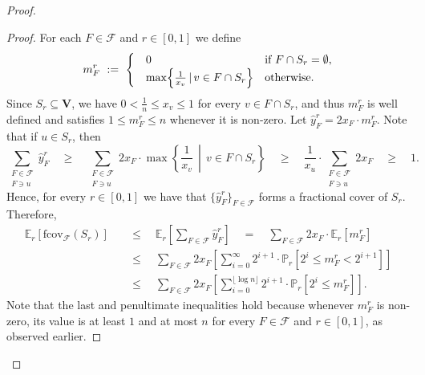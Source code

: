 \documentclass[11pt]{amsart}
\begin{document}
\begin{proof}
    \begin{proof}
        For each $F\in \mathcal{F}$ and $r\in [0,1]$ we define 
        $$
        m^r_F \ := \
        \begin{cases}
            \quad 0 & \text{if } F \cap S_r = \emptyset,\\
            \quad \max\Bigl\{ \frac{1}{x_v} \, |\, v \in F \cap S_r \Bigr\} & \text{otherwise}.
        \end{cases}
        $$    
        Since $S_r \subseteq \mathbf{V}$, we have $0 < \frac{1}{n} \leq x_v \leq 1$ for every $v \in F \cap S_r$, and thus $m^r_F$ is well defined and satisfies $1 \leq m^r_F \leq n$ whenever it is non-zero.
        Let $\hat{y}_F^r = 2x_F \cdot m^r_F$. Note that if $u \in S_r$, then
        $$
        \sum_{\substack{F \in \mathcal{F}\\ F \ni u}} \hat{y}_F^r \quad  
        \geq \quad \sum_{\substack{F \in \mathcal{F}\\ F \ni u}} 2x_F \cdot \max\left\{ \frac{1}{x_v} \,\middle|\, v \in F \cap S_r \right\} \quad 
        \geq \quad \frac{1}{x_u} \cdot \sum_{\substack{F \in \mathcal{F}\\ F \ni u}} 2x_F \quad 
        \geq \quad 1.
        $$
        Hence, for every $r \in [0, 1]$ we have that $\{\hat{y}_F^r\}_{F \in \mathcal{F}}$ forms a fractional cover of $S_r$. Therefore, 
        \begin{align}\label{eq:expectaion_A-B_separator}
            \nonumber \mathbb{E}_r[\mathrm{fcov}_{\mathcal{F}}(S_r)] \quad
            &\leq \quad \mathbb{E}_r\left[\sum_{F \in \mathcal{F}} \hat{y}_F^r\right]\quad = \quad \sum_{F \in \mathcal{F}} 2x_F \cdot \mathbb{E}_r[m_F^r]\\
            \nonumber &\leq \quad \sum_{F \in \mathcal{F}} 2x_F \left[ \sum_{i = 0}^{\infty} 2^{i+1} \cdot \mathbb{P}_r[2^i \leq m_F^r < 2^{i+1}] \right]\\
            &\leq \quad \sum_{F \in \mathcal{F}} 2x_F \left[ \sum_{i = 0}^{\lfloor \log n \rfloor} 2^{i+1} \cdot \mathbb{P}_r[2^i \leq m_F^r] \right].
        \end{align} 
        Note that the last and penultimate inequalities hold because whenever $m_F^r$ is non-zero, its value is at least $1$ and at most $n$ for every $F \in \mathcal{F}$ and $r \in [0,1]$, as observed earlier.
        

\end{proof}
\end{proof}
\end{document}
